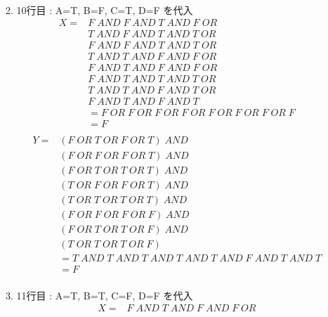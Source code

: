 \documentclass[dvipdfmx,10pt, a4j]{jarticle}
\theoremstyle{definition}
\begin{document}
\begin{enumerate}[i)]
\begin{enumerate}[1)]
\begin{align*}
            \end{align*}
            \item 10行目 : A=T, B=F, C=T, D=F を代入\\
            \begin{align*}
                X = &F\; AND\; F\; AND\; T\; AND\; F\; OR\\
                &T\; AND\; F\; AND\; T\; AND\; T\; OR\\
                &F\; AND\; F\; AND\; T\; AND\; T\; OR\\
                &T\; AND\; T\; AND\; F\; AND\; F\; OR\\
                &F\; AND\; T\; AND\; F\; AND\; F\; OR\\
                &F\; AND\; T\; AND\; T\; AND\; T\; OR\\
                &T\; AND\; T\; AND\; F\; AND\; T\; OR\\
                &F\; AND\; T\; AND\; F\; AND\; T\\
                &= F\; OR\; F\; OR\; F\; OR\; F\; OR\; F\; OR\; F\; OR\; F\; OR\; F\\
                &= F\\
            \end{align*}
            \begin{align*}
                Y = & (F\; OR\; T\; OR\; F\; OR\; T) \; AND\\
                & (F\; OR\; F\; OR\; F\; OR\; T)\; AND\\
                & (F\; OR\; T\; OR\; T\; OR\; T)\; AND\\
                & (T\; OR\; F\; OR\; F\; OR\; T)\; AND\\
                & (T\; OR\; T\; OR\; T\; OR\; T)\; AND\\
                & (F\; OR\; F\; OR\; F\; OR\; F)\; AND\\
                & (F\; OR\; T\; OR\; T\; OR\; F)\; AND\\
                & (T\; OR\; T\; OR\; T\; OR\; F)\\
                &= T\; AND\; T\; AND\; T\; AND\; T\; AND\; T\; AND\; F\; AND\; T\; AND\; T\\
                &= F\\
            \end{align*}
            \item 11行目 : A=T, B=T, C=F, D=F を代入\\
            \begin{align*}
                X = &F\; AND\; T\; AND\; F\; AND\; F\; OR\\

\end{align*}
\end{enumerate}
\end{enumerate}
\end{document}
